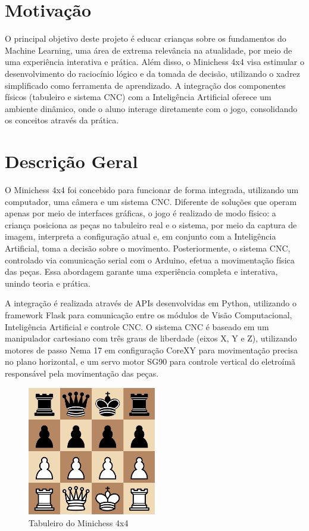 \documentclass[a4paper,12pt]{article}
\begin{document}
\section{Motivação}
O principal objetivo deste projeto é educar crianças sobre os fundamentos do Machine Learning, uma área de extrema relevância na atualidade, por meio de uma experiência interativa e prática. Além disso, o Minichess 4x4 visa estimular o desenvolvimento do raciocínio lógico e da tomada de decisão, utilizando o xadrez simplificado como ferramenta de aprendizado. A integração dos componentes físicos (tabuleiro e sistema CNC) com a Inteligência Artificial oferece um ambiente dinâmico, onde o aluno interage diretamente com o jogo, consolidando os conceitos através da prática.

\section{Descrição Geral}
O Minichess 4x4 foi concebido para funcionar de forma integrada, utilizando um computador, uma câmera e um sistema CNC. Diferente de soluções que operam apenas por meio de interfaces gráficas, o jogo é realizado de modo físico: a criança posiciona as peças no tabuleiro real e o sistema, por meio da captura de imagem, interpreta a configuração atual e, em conjunto com a Inteligência Artificial, toma a decisão sobre o movimento. Posteriormente, o sistema CNC, controlado via comunicação serial com o Arduino, efetua a movimentação física das peças. Essa abordagem garante uma experiência completa e interativa, unindo teoria e prática. 

A integração é realizada através de APIs desenvolvidas em Python, utilizando o framework Flask para comunicação entre os módulos de Visão Computacional, Inteligência Artificial e controle CNC. O sistema CNC é baseado em um manipulador cartesiano com três graus de liberdade (eixos X, Y e Z), utilizando motores de passo Nema 17 em configuração CoreXY para movimentação precisa no plano horizontal, e um servo motor SG90 para controle vertical do eletroímã responsável pela movimentação das peças.

\begin{figure}[H]
    \centering
    \includegraphics[width=0.5\textwidth]{images/minichess4x4.png} %
    \caption{Tabuleiro do Minichess 4x4}
    \label{fig:modelo_cnc}
\end{figure}
\end{document}
